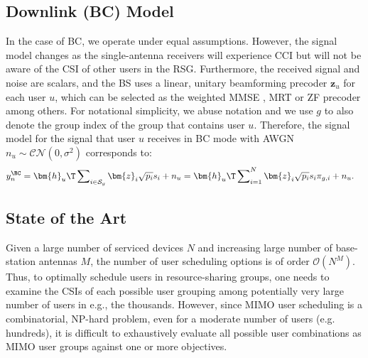 \subsection{Downlink (BC) Model} \label{system:ssec:usch_bc}

In the case of BC, we operate under equal assumptions. However, the signal model changes as the single-antenna receivers will experience CCI but will not be aware of the CSI of other users in the RSG. Furthermore, the received signal and noise are scalars, and the BS uses a linear, unitary beamforming precoder $\bm{z}_u$ for each user $u$, which can be selected as the weighted MMSE \cite{Bjornson2013wmmsebc}, MRT \cite{Lo1999mrt} or ZF precoder \cite{Jindal206zfbc} among others. For notational simplicity, we abuse notation and we use $g$ to also denote the group index of the group that contains user $u$.
Therefore, the signal model for the signal that user $u$ receives in BC mode with AWGN $n_u\sim\mathcal{CN}(0,\sigma^2)$ corresponds to:
\begin{align}\label{system:eqn:usch_sig_bc}
	{y}_n^{\BC}
	&= \bm{h}_u\T\sum\nolimits_{i \in \mathcal{S}_{g}}\bm{z}_i\sqrt{p_i} s_{i}  + {n}_u
	= \bm{h}_u\T\sum\nolimits_{i=1}^N\bm{z}_i\sqrt{p_i} s_{i}\pi_{g,i}  + {n}_u.
\end{align}



\subsection{State of the Art}\label{system:ssec:usch_stateart}

Given a large number of serviced devices $N$ and increasing large number of base-station antennas $M$, the number of user scheduling options is of order $\mathcal{O}(N^M)$. 
Thus, to optimally schedule users in resource-sharing groups, one needs to examine the CSIs of each possible user grouping among potentially very large number of users in e.g., the thousands. However, since MIMO user scheduling is a combinatorial, NP-hard problem, even for a moderate number of users (e.g. hundreds), it is difficult to exhaustively evaluate all possible user combinations as MIMO user groups against one or more objectives.

